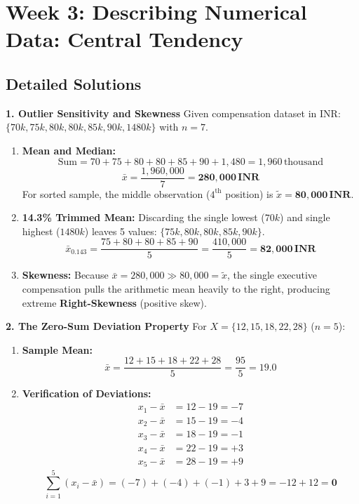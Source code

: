 \section*{Week 3: Describing Numerical Data: Central Tendency}

\subsection*{Detailed Solutions}

\textbf{1. Outlier Sensitivity and Skewness}
Given compensation dataset in INR: $\{70k, 75k, 80k, 80k, 85k, 90k, 1480k\}$ with $n = 7$.
\begin{enumerate}
    \item \textbf{Mean and Median:}
    $$\text{Sum} = 70 + 75 + 80 + 80 + 85 + 90 + 1{,}480 = 1{,}960\,\text{thousand}$$
    $$\bar{x} = \frac{1{,}960{,}000}{7} = \mathbf{280{,}000\,\text{INR}}$$
    For sorted sample, the middle observation ($4^{\text{th}}$ position) is $\tilde{x} = \mathbf{80{,}000\,\text{INR}}$.
    \item \textbf{14.3\% Trimmed Mean:} Discarding the single lowest ($70k$) and single highest ($1480k$) leaves 5 values: $\{75k, 80k, 80k, 85k, 90k\}$.
    $$\bar{x}_{0.143} = \frac{75 + 80 + 80 + 85 + 90}{5} = \frac{410{,}000}{5} = \mathbf{82{,}000\,\text{INR}}$$
    \item \textbf{Skewness:} Because $\bar{x} = 280{,}000 \gg 80{,}000 = \tilde{x}$, the single executive compensation pulls the arithmetic mean heavily to the right, producing extreme \textbf{Right-Skewness} (positive skew).
\end{enumerate}

\textbf{2. The Zero-Sum Deviation Property}
For $X = \{12, 15, 18, 22, 28\}$ ($n = 5$):
\begin{enumerate}
    \item \textbf{Sample Mean:}
    $$\bar{x} = \frac{12 + 15 + 18 + 22 + 28}{5} = \frac{95}{5} = \mathbf{19.0}$$
    \item \textbf{Verification of Deviations:}
    \begin{align*}
        x_1 - \bar{x} &= 12 - 19 = -7 \\
        x_2 - \bar{x} &= 15 - 19 = -4 \\
        x_3 - \bar{x} &= 18 - 19 = -1 \\
        x_4 - \bar{x} &= 22 - 19 = +3 \\
        x_5 - \bar{x} &= 28 - 19 = +9
    \end{align*}
    $$\sum_{i=1}^5 (x_i - \bar{x}) = (-7) + (-4) + (-1) + 3 + 9 = -12 + 12 = \mathbf{0}$$
\end{enumerate}

